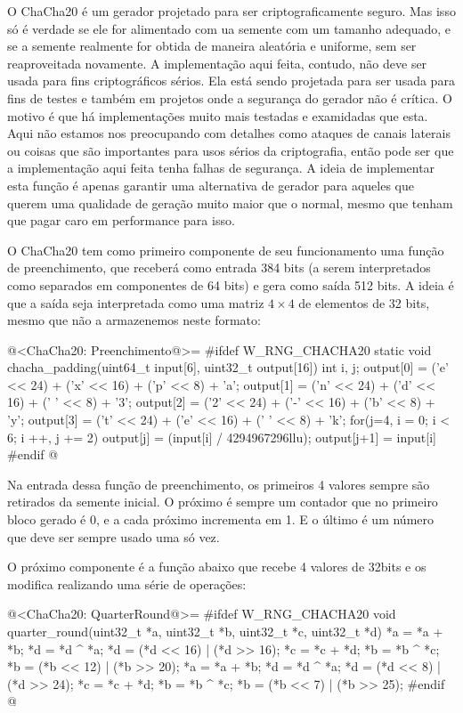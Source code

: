 
O ChaCha20 é um gerador projetado para ser criptograficamente
seguro. Mas isso só é verdade se ele for alimentado com ua semente com
um tamanho adequado, e se a semente realmente for obtida de maneira
aleatória e uniforme, sem ser reaproveitada novamente. A implementação
aqui feita, contudo, não deve ser usada para fins criptográficos
sérios. Ela está sendo projetada para ser usada para fins de testes e
também em projetos onde a segurança do gerador não é crítica. O motivo
é que há implementações muito mais testadas e examidadas que
esta. Aqui não estamos nos preocupando com detalhes como ataques de
canais laterais ou coisas que são importantes para usos sérios da
criptografia, então pode ser que a implementação aqui feita tenha
falhas de segurança. A ideia de implementar esta função é apenas
garantir uma alternativa de gerador para aqueles que querem uma
qualidade de geração muito maior que o normal, mesmo que tenham que
pagar caro em performance para isso.

O ChaCha20 tem como primeiro componente de seu funcionamento uma
função de preenchimento, que receberá como entrada 384 bits (a serem
interpretados como separados em componentes de 64 bits) e gera como
saída 512 bits. A ideia é que a saída seja interpretada como uma
matriz $4\times 4$ de elementos de 32 bits, mesmo que não a
armazenemos neste formato:

@<ChaCha20: Preenchimento@>=
#ifdef W_RNG_CHACHA20
static void chacha_padding(uint64_t input[6], uint32_t output[16]){
  int i, j;
  output[0] = ('e' << 24) + ('x' << 16) + ('p' << 8) + 'a';
  output[1] = ('n' << 24) + ('d' << 16) + (' ' << 8) + '3';
  output[2] = ('2' << 24) + ('-' << 16) + ('b' << 8) + 'y';
  output[3] = ('t' << 24) + ('e' << 16) + (' ' << 8) + 'k';
  for(j=4, i = 0; i < 6; i ++, j += 2){
    output[j] = (input[i] / 4294967296llu);
    output[j+1] = input[i] %
  }
}
#endif
@

Na entrada dessa função de preenchimento, os primeiros 4 valores
sempre são retirados da semente inicial. O próximo é sempre um
contador que no primeiro bloco gerado é 0, e a cada próximo incrementa
em 1. E o último é um número que deve ser sempre usado uma só vez.

O próximo componente é a função abaixo que recebe 4 valores de 32bits
e os modifica realizando uma série de operações:

@<ChaCha20: QuarterRound@>=
#ifdef W_RNG_CHACHA20
void quarter_round(uint32_t *a, uint32_t *b, uint32_t *c, uint32_t *d){
  *a = *a + *b;
  *d = *d ^ *a;
  *d = (*d << 16) | (*d >> 16);
  *c = *c + *d;
  *b = *b ^ *c;
  *b = (*b << 12) | (*b >> 20);
  *a = *a + *b;
  *d = *d ^ *a;
  *d = (*d << 8) | (*d >> 24);
  *c = *c + *d;
  *b = *b ^ *c;
  *b = (*b << 7) | (*b >> 25);
}
#endif
@

